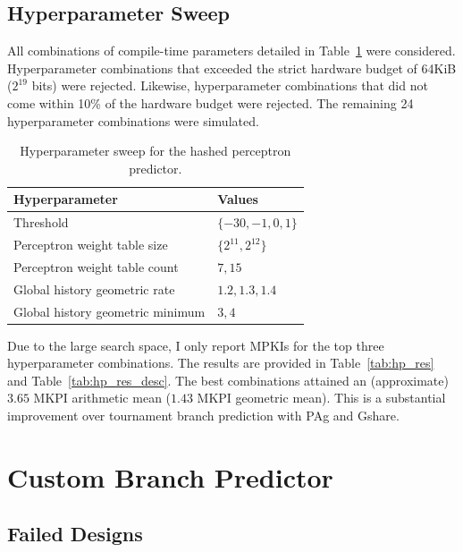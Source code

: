 \documentclass{article}
\begin{document}
\subsection{Hyperparameter Sweep}

All combinations of compile-time parameters detailed in Table~\ref{tab:hp_hp} were considered. Hyperparameter combinations that exceeded the strict hardware 
budget of 64KiB ($2^{19}$ bits) were rejected. Likewise, hyperparameter combinations that did not come within 10\% of the hardware budget were rejected. The 
remaining 24 hyperparameter combinations were simulated.

\begin{table}[H]
    \centering
    \begin{tabular}{ll}
        \toprule
        \textbf{Hyperparameter} & \textbf{Values} \\
        \midrule
        Threshold & $\{-30, -1, 0, 1\}$ \\
        Perceptron weight table size & $\{2^{11}, 2^{12}\}$ \\
        Perceptron weight table count & $7, 15$ \\
        Global history geometric rate & $1.2, 1.3, 1.4$ \\
        Global history geometric minimum & $3, 4$ \\
        \bottomrule
    \end{tabular}
    \caption{Hyperparameter sweep for the hashed perceptron predictor.}
    \label{tab:hp_hp}
\end{table}

\noindent
Due to the large search space, I only report MPKIs for the top three hyperparameter combinations. The results are provided in Table~\ref{tab:hp_res} and 
Table~\ref{tab:hp_res_desc}. The best combinations attained an (approximate) $3.65$ MKPI arithmetic mean ($1.43$ MKPI geometric mean). This is a substantial 
improvement over tournament branch prediction with PAg and Gshare.

\section{Custom Branch Predictor}

\subsection{Failed Designs}
\end{document}

